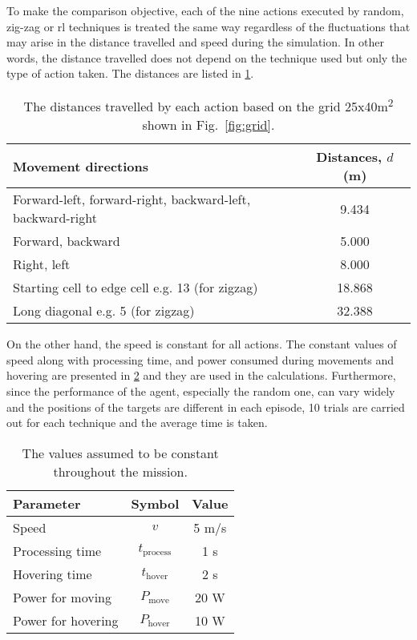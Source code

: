 \documentclass[../main.tex]{subfiles}
\begin{document}
To make the comparison objective, 
each of the nine actions executed by random, zig-zag
or \gls{rl} techniques is treated the same way regardless 
of the fluctuations that may arise in the 
distance travelled and speed during
the simulation.
In other words, the distance travelled does not depend
on the technique used but only 
the type of action taken. 
The distances are listed in \cref{tab:distances}.

\begin{table}[tbp]
\caption{The distances travelled by each action based on
    the grid 25x40m\textsuperscript{2} shown in 
    Fig.~\ref{fig:grid}.}
\label{tab:distances}
\centering
\begin{tabular}{p{3.4in} c}
\toprule
Movement directions & Distances, $d$ (m) \\
\midrule
\raggedright Forward-left, forward-right, 
backward-left, backward-right & 9.434 \\
Forward, backward & 5.000 \\
Right, left & 8.000 \\
Starting cell to edge cell e.g. 13\textrightarrow 1 (for zigzag) & 18.868 \\
\raggedright Long diagonal e.g. 5\textrightarrow 6 (for zigzag) & 32.388 \\
\bottomrule
\end{tabular}
\end{table}

On the other hand, the speed is constant for all actions. 
The constant values of speed along with processing time,
and power consumed during movements and hovering
are presented
in \cref{tab:assumptions}
and they are used in the calculations.
Furthermore, since the performance of the agent,
especially the random one, can vary widely and
the positions of the targets are different in each episode, 
10 trials are carried out for each technique and
the average time is taken.

\begin{table}[tbp]
\caption{The values assumed to be constant throughout the
mission.}
\label{tab:assumptions}
\centering
\begin{tabular}{l c c}
\toprule
Parameter & Symbol & Value \\
\midrule
Speed & $v$ & 5 m/s \\
Processing time & $t_{\text{process}}$ & 1 s \\
Hovering time & $t_{\text{hover}}$ & 2 s \\
Power for moving & $P_{\text{move}}$ & 20 W \\
Power for hovering & $P_{\text{hover}}$ & 10 W \\
\bottomrule
\end{tabular}
\end{table}
\end{document}
